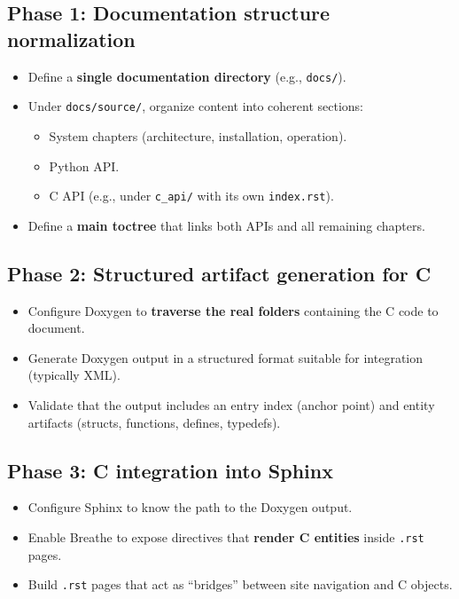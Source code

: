\documentclass[11pt,a4paper]{article}
\begin{document}
\subsection{Phase 1: Documentation structure normalization}
\begin{itemize}[leftmargin=*,itemsep=2pt]
  \item Define a \textbf{single documentation directory} (e.g., \texttt{docs/}).
  \item Under \texttt{docs/source/}, organize content into coherent sections:
  \begin{itemize}[leftmargin=*,itemsep=2pt]
    \item System chapters (architecture, installation, operation).
    \item Python API.
    \item C API (e.g., under \texttt{c\_api/} with its own \texttt{index.rst}).
  \end{itemize}
  \item Define a \textbf{main toctree} that links both APIs and all remaining chapters.
\end{itemize}

\subsection{Phase 2: Structured artifact generation for C}
\begin{itemize}[leftmargin=*,itemsep=2pt]
  \item Configure Doxygen to \textbf{traverse the real folders} containing the C code to document.
  \item Generate Doxygen output in a structured format suitable for integration (typically XML).
  \item Validate that the output includes an entry index (anchor point) and entity artifacts (structs, functions, defines, typedefs).
\end{itemize}

\subsection{Phase 3: C integration into Sphinx}
\begin{itemize}[leftmargin=*,itemsep=2pt]
  \item Configure Sphinx to know the path to the Doxygen output.
  \item Enable Breathe to expose directives that \textbf{render C entities} inside \texttt{.rst} pages.
  \item Build \texttt{.rst} pages that act as “bridges” between site navigation and C objects.
\end{itemize}
\end{document}
